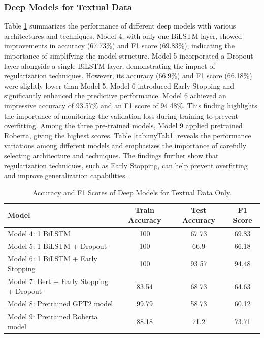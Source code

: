 \documentclass[12pt]{article}
\begin{document}
\subsubsection{Deep Models for Textual Data}
Table \ref{tab:ResultDepp} summarizes the performance of different deep models with various architectures and techniques. Model 4, with only one BiLSTM layer, showed improvements in accuracy (67.73$\%$) and F1 score (69.83$\%$), indicating the importance of simplifying the model structure. Model 5 incorporated a Dropout layer alongside a single BiLSTM layer, demonstrating the impact of regularization techniques. However, its accuracy (66.9$\%$) and F1 score (66.18$\%$) were slightly lower than Model 5. Model 6 introduced Early Stopping and significantly enhanced the predictive performance. Model 6 achieved an impressive accuracy of 93.57$\%$ and an F1 score of 94.48$\%$. This finding highlights the importance of monitoring the validation loss during training to prevent overfitting.  Among the three pre-trained models, Model 9 applied pretrained Roberta, giving the highest scores. Table \ref{tab:myTab1} reveals the performance variations among different models and emphasizes the importance of carefully selecting architecture and techniques. The findings further show that regularization techniques, such as Early Stopping, can help prevent overfitting and improve generalization capabilities.
\begin{table}[H]
\centering
\begin{tabular}{l c c c}
\hline
\textbf{Model} & \textbf{Train Accuracy} & \textbf{Test Accuracy} & \textbf{F1 Score} \\
\hline
Model 4:  1 BiLSTM & 100 &  67.73 & 69.83 \\ 
Model 5:  1 BiLSTM + Dropout & 100 & 66.9 & 66.18 \\ 
Model 6: 1 BiLSTM + Early Stopping & 100 &  93.57 &  94.48 \\ 
Model 7: Bert + Early Stopping + Dropout & 83.54&  68.73 & 64.63 \\ 
Model 8: Pretrained GPT2 model & 99.79 &  58.73 & 60.12 \\
Model 9: Pretrained Roberta model & 88.18&  71.2 & 73.71 \\ 
\hline
\end{tabular}
\caption{Accuracy and F1 Scores of Deep Models for Textual Data Only.}
\label{tab:ResultDepp}
\end{table}
\end{document}
